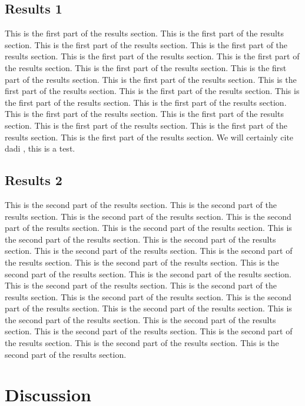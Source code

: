 \documentclass{pnastwo}
\begin{document}
\begin{article}
\subsection{Results 1}
This is the first part of the results section. This is the first part
of the results section. This is the first part of the results
section. This is the first part of the results section. This is the
first part of the results section. This is the first part of the
results section. This is the first part of the results section. This
is the first part of the results section. This is the first part of
the results section. This is the first part of the results
section. This is the first part of the results section. This is the
first part of the results section. This is the first part of the
results section. This is the first part of the results section. This
is the first part of the results section. This is the first part of
the results section. This is the first part of the results
section. This is the first part of the results section. 
We will certainly cite dadi \cite{dadi}, this is a test.

\subsection{Results 2}
This is the second part of the results section. This is the second part of the results section. This is the second part of the results section. This is the second part of the results section. This is the second part of the results section. This is the second part of the results section. This is the second part of the results section. This is the second part of the results section. This is the second part of the results section. This is the second part of the results section. This is the second part of the results section. This is the second part of the results section. This is the second part of the results section. This is the second part of the results section. This is the second part of the results section. This is the second part of the results section. This is the second part of the results section. This is the second part of the results section. This is the second part of the results section. This is the second part of the results section. This is the second part of the results section. This is the second part of the results section. This is the second part of the results section. 

\section{Discussion}

\end{article}
\end{document}
